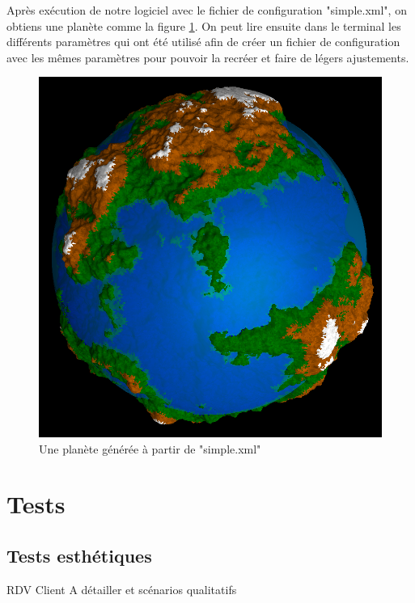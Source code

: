 \documentclass[a4paper]{article}
\begin{document}

\newpage
Après exécution de notre logiciel avec le fichier de configuration "simple.xml", on obtiens une planète comme la figure \ref{notre_planete}. On peut lire ensuite dans le terminal les différents paramètres qui ont été utilisé afin de créer un fichier de configuration avec les mêmes paramètres pour pouvoir la recréer et faire de légers ajustements.\\

\begin{figure}[!h]
    \begin{center}
        \includegraphics[width=0.6\linewidth]{img/notre_planete.png} 
        \caption{Une planète générée à partir de "simple.xml"}
        \label{notre_planete}
    \end{center}
\end{figure}


\newpage 
\section{Tests}
\subsection{Tests esthétiques}

RDV Client A détailler et scénarios qualitatifs
\end{document}
